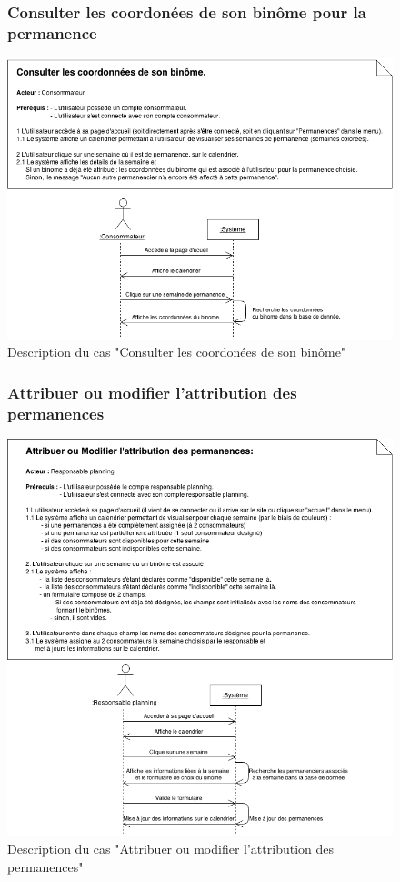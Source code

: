 \documentclass[12pt]{report}
\begin{document}
\begin{figure}[!h]
\centering
\subsubsection{Consulter les coordonées de son binôme pour la permanence~~~~~~~~~~~~~~~~~~~~~~~~~~~}
\includegraphics[width=1.\textwidth]{./ressources/desc_UC_coo_binome.png}
\caption{Description du cas "Consulter les coordonées de son binôme"}
\end{figure}
\clearpage

\begin{figure}[!h]
\centering
\subsubsection{Attribuer ou modifier l'attribution des permanences~~~~~~~~~~~~~~~~~~~~~~~~~~~}
\includegraphics[width=1.\textwidth]{./ressources/desc_UC_attribuer_permanences.png}
\caption{Description du cas "Attribuer ou modifier l'attribution des permanences"}
\end{figure}
\clearpage
\end{document}

